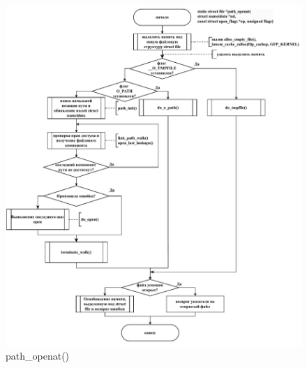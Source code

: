 \begin{figure}[ht]
	\centering
	\includegraphics[width=\textwidth]{img/path_openat.pdf}
	\caption{path\_openat()}
\end{figure}

